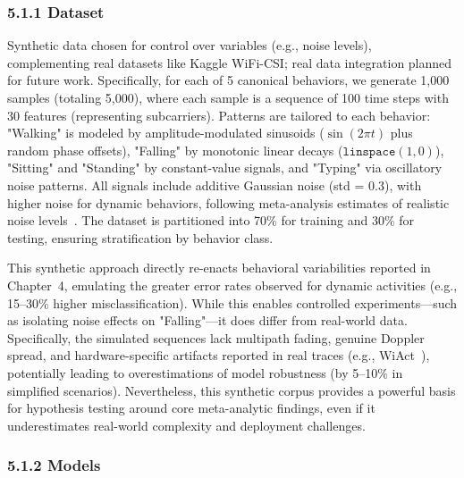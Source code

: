 \documentclass[Afour,sageh,times]{sagej}
\begin{document}
\subsubsection{5.1.1 Dataset}
Synthetic data chosen for control over variables (e.g., noise levels), complementing real datasets like Kaggle WiFi-CSI; real data integration planned for future work.
 Specifically, for each of 5 canonical behaviors, we generate 1,000 samples (totaling 5,000), where each sample is a sequence of 100 time steps with 30 features (representing subcarriers). Patterns are tailored to each behavior: "Walking" is modeled by amplitude-modulated sinusoids ($\sin(2\pi t)$ plus random phase offsets), "Falling" by monotonic linear decays ($\texttt{linspace}(1, 0)$), "Sitting" and "Standing" by constant-value signals, and "Typing" via oscillatory noise patterns. All signals include additive Gaussian noise (std = 0.3), with higher noise for dynamic behaviors, following meta-analysis estimates of realistic noise levels~\citep{guo2019robust}. The dataset is partitioned into 70\% for training and 30\% for testing, ensuring stratification by behavior class.

This synthetic approach directly re-enacts behavioral variabilities reported in Chapter~4, emulating the greater error rates observed for dynamic activities (e.g., 15--30\% higher misclassification). While this enables controlled experiments---such as isolating noise effects on "Falling"---it does differ from real-world data. Specifically, the simulated sequences lack multipath fading, genuine Doppler spread, and hardware-specific artifacts reported in real traces (e.g., WiAct~\citep{yan2020wiact}), potentially leading to overestimations of model robustness (by 5--10\% in simplified scenarios). Nevertheless, this synthetic corpus provides a powerful basis for hypothesis testing around core meta-analytic findings, even if it underestimates real-world complexity and deployment challenges.

\subsubsection{5.1.2 Models}
\end{document}
